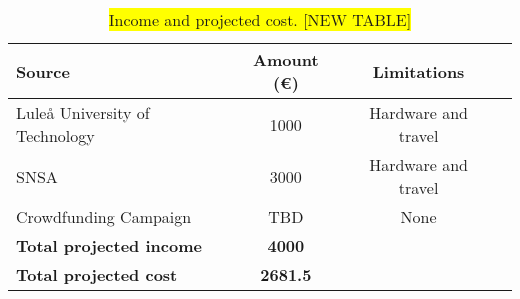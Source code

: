 \begin{table}[H]
\centering
\begin{tabular}{|l|c|c|c|} 
\hline
Source & Amount (\euro) & Limitations   \\ 
\hline
Luleå University of Technology & 1000 & Hardware and travel \\
SNSA & 3000 & Hardware and travel \\
Crowdfunding Campaign & TBD & None \\
\hline
\textbf{Total projected income} & \textbf{4000} & \\
\hline
\bf{Total projected cost} & \bf{2681.5} & \\
\hline
\end{tabular}
\caption{\colorbox{yellow}{Income and projected cost. [NEW TABLE]}}
\label{table:income-and-cost}
\end{table}

\raggedbottom